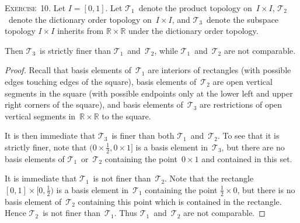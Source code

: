 \documentclass[letterpaper]{article}
\newcommand{\exercise}[1]{\goodbreak\noindent\textsc{Exercise~{#1}.}}
\newcommand{\R}{\mathbb{R}}
\newcommand{\T}{\mathcal{T}}
\begin{document}
\bigskip
\exercise{10}
Let $I=[0,1]$. Let $\T_1$~denote the product topology on~$I\times I$, $\T_2$~denote the dictionary order topology on~$I\times I$, and $\T_3$~denote the subspace topology $I\times I$ inherits from $\R\times\R$ under the dictionary order topology.

Then $\T_3$~is strictly finer than $\T_1$~and~$\T_2$, while $\T_1$~and~$\T_2$ are not comparable.
\begin{proof}
Recall that basis elements of~$\T_1$ are interiors of rectangles (with possible edges touching edges of the square), basis elements of~$\T_2$ are open vertical segments in the square (with possible endpoints only at the lower left and upper right corners of the square), and basis elements of~$\T_3$ are restrictions of open vertical segments in~$\R\times\R$ to the square.

It is then immediate that $\T_3$~is finer than both $\T_1$~and~$\T_2$. To see that it is strictly finer, note that $(0\times\tfrac{1}{2},0\times1]$ is a basis element in~$\T_3$, but there are no basis elements of $\T_1$~or~$\T_2$ containing the point~$0\times 1$ and contained in this set.

It is immediate that $\T_1$~is not finer than~$\T_2$. Note that the rectangle $[0,1]\times[0,\tfrac{1}{2})$ is a basis element in~$\T_1$ containing the point $\tfrac{1}{2}\times 0$, but there is no basis element of~$\T_2$ containing this point which is contained in the rectangle. Hence $\T_2$~is not finer than~$\T_1$. Thus $\T_1$~and~$\T_2$ are not comparable.
\end{proof}
\end{document}
